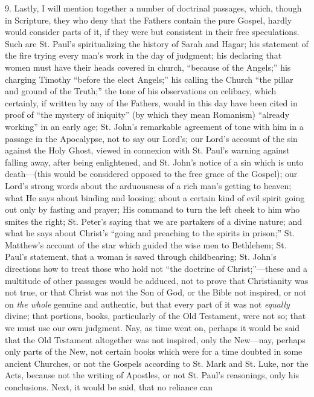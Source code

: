 9. Lastly, I will mention together a number of doctrinal passages,
which, though in Scripture, they who deny that the Fathers contain the
pure Gospel, hardly would consider parts of it, if they were but
consistent in their free speculations. Such are St. Paul's
spiritualizing the history of Sarah and Hagar; his statement of
the fire trying every man's work in the day of judgment; his declaring
that women must have their heads covered in church, ``because of
the Angels;'' his charging Timothy ``before the elect
Angels;'' his calling the Church ``the pillar and ground of
the Truth;'' the tone of his observations on celibacy, which
certainly, if written by any of the Fathers, would in this day have
been cited in proof of ``the mystery of iniquity'' (by which
they mean Romanism) ``already working'' in an early age; St.
John's remarkable agreement of tone with him in a passage in the
Apocalypse, not to say our Lord's; our Lord's account of the sin
against the Holy Ghost, viewed in connexion with St. Paul's warning
against falling away, after being enlightened, and St. John's notice
of a sin which is unto death—(this would be considered opposed to
the free grace of the Gospel); our Lord's strong words about the
arduousness of a rich man's getting to heaven; what He says about
binding and loosing; about a certain kind of evil spirit going out
only by fasting and prayer; His command to turn the left cheek to him
who smites the right; St. Peter's saying that we are partakers of a
divine nature; and what he says about Christ's ``going and
preaching to the spirits in prison;'' St. Matthew's account of the
star which guided the wise men to Bethlehem; St. Paul's statement,
that a woman is saved through childbearing; St. John's directions how
to treat those who hold not ``the doctrine of Christ;''—these
and a multitude of other passages would be adduced, not to prove that
Christianity was not true, or that Christ was not the Son of God, or
the Bible not inspired, or not on \emph{the whole} genuine and
authentic, but that every part of it was not \emph{equally} divine;
that portions, books, particularly of the Old Testament, were
not so; that we must use our own judgment. Nay, as time went on,
perhaps it would be said that the Old Testament altogether was not
inspired, only the New—nay, perhaps only parts of the New, not
certain books which were for a time doubted in some ancient Churches,
or not the Gospels according to St. Mark and St. Luke, nor the Acts,
because not the writing of Apostles, or not St. Paul's reasonings,
only his conclusions. Next, it would be said, that no reliance can
